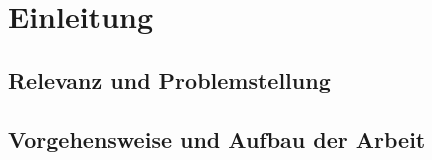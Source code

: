 \section{Einleitung}

\subsection{Relevanz und Problemstellung}


\subsection{Vorgehensweise und Aufbau der Arbeit}

